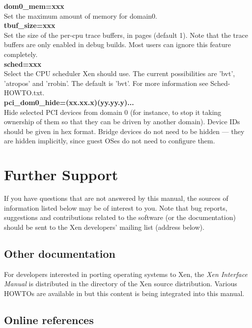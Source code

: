 \documentclass[11pt,twoside,final,openright]{xenstyle}
\begin{document}
{{\bf dom0\_mem=xxx } \\
 Set the maximum amount of memory for domain0. \\

{\bf tbuf\_size=xxx } \\
 Set the size of the per-cpu trace buffers, in pages
 (default 1).  Note that the trace buffers are only
 enabled in debug builds.  Most users can ignore
 this feature completely. \\

{\bf sched=xxx } \\
 Select the CPU scheduler Xen should use.  The current
 possibilities are 'bvt', 'atropos' and 'rrobin'.  The
 default is 'bvt'.  For more information see
 Sched-HOWTO.txt. \\

{\bf pci\_dom0\_hide=(xx.xx.x)(yy.yy.y)... } \\
Hide selected PCI devices from domain 0 (for instance, to stop it
taking ownership of them so that they can be driven by another
domain).  Device IDs should be given in hex format.  Bridge devices do
not need to be hidden --- they are hidden implicitly, since guest OSes
do not need to configure them.

\chapter{Further Support}

If you have questions that are not answered by this manual, the
sources of information listed below may be of interest to you.  Note
that bug reports, suggestions and contributions related to the
software (or the documentation) should be sent to the Xen developers'
mailing list (address below).

\section{Other documentation}

For developers interested in porting operating systems to Xen, the
{\em Xen Interface Manual} is distributed in the 
directory of the Xen source distribution.  Various HOWTOs are
available in  but this content is being integrated
into this manual.

\section{Online references}

}
\end{document}
